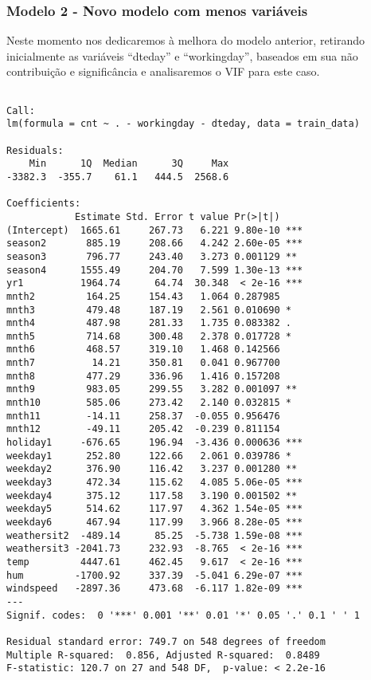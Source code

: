 \documentclass[
  letterpaper,
  DIV=11,
  numbers=noendperiod]{scrartcl}
\begin{document}
\subsubsection{\texorpdfstring{\textbf{Modelo 2 - Novo modelo com menos
variáveis}}{Modelo 2 - Novo modelo com menos variáveis}}\label{modelo-2---novo-modelo-com-menos-variuxe1veis}

Neste momento nos dedicaremos à melhora do modelo anterior, retirando
inicialmente as variáveis ``dteday'' e ``workingday'', baseados em sua
não contribuição e significância e analisaremos o VIF para este caso.

\begin{verbatim}

Call:
lm(formula = cnt ~ . - workingday - dteday, data = train_data)

Residuals:
    Min      1Q  Median      3Q     Max 
-3382.3  -355.7    61.1   444.5  2568.6 

Coefficients:
            Estimate Std. Error t value Pr(>|t|)    
(Intercept)  1665.61     267.73   6.221 9.80e-10 ***
season2       885.19     208.66   4.242 2.60e-05 ***
season3       796.77     243.40   3.273 0.001129 ** 
season4      1555.49     204.70   7.599 1.30e-13 ***
yr1          1964.74      64.74  30.348  < 2e-16 ***
mnth2         164.25     154.43   1.064 0.287985    
mnth3         479.48     187.19   2.561 0.010690 *  
mnth4         487.98     281.33   1.735 0.083382 .  
mnth5         714.68     300.48   2.378 0.017728 *  
mnth6         468.57     319.10   1.468 0.142566    
mnth7          14.21     350.81   0.041 0.967700    
mnth8         477.29     336.96   1.416 0.157208    
mnth9         983.05     299.55   3.282 0.001097 ** 
mnth10        585.06     273.42   2.140 0.032815 *  
mnth11        -14.11     258.37  -0.055 0.956476    
mnth12        -49.11     205.42  -0.239 0.811154    
holiday1     -676.65     196.94  -3.436 0.000636 ***
weekday1      252.80     122.66   2.061 0.039786 *  
weekday2      376.90     116.42   3.237 0.001280 ** 
weekday3      472.34     115.62   4.085 5.06e-05 ***
weekday4      375.12     117.58   3.190 0.001502 ** 
weekday5      514.62     117.97   4.362 1.54e-05 ***
weekday6      467.94     117.99   3.966 8.28e-05 ***
weathersit2  -489.14      85.25  -5.738 1.59e-08 ***
weathersit3 -2041.73     232.93  -8.765  < 2e-16 ***
temp         4447.61     462.45   9.617  < 2e-16 ***
hum         -1700.92     337.39  -5.041 6.29e-07 ***
windspeed   -2897.36     473.68  -6.117 1.82e-09 ***
---
Signif. codes:  0 '***' 0.001 '**' 0.01 '*' 0.05 '.' 0.1 ' ' 1

Residual standard error: 749.7 on 548 degrees of freedom
Multiple R-squared:  0.856, Adjusted R-squared:  0.8489 
F-statistic: 120.7 on 27 and 548 DF,  p-value: < 2.2e-16
\end{verbatim}
\end{document}
